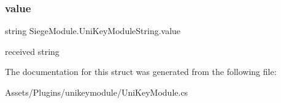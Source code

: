\subsubsection{\texorpdfstring{value}{value}}
{\footnotesize\ttfamily string Siege\+Module.\+Uni\+Key\+Module\+String.\+value}



received string 



The documentation for this struct was generated from the following file\+:\begin{DoxyCompactItemize}
\item 
Assets/\+Plugins/unikeymodule/Uni\+Key\+Module.\+cs\end{DoxyCompactItemize}
